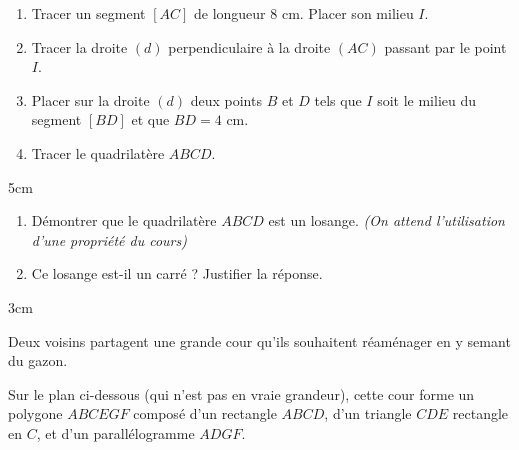 \documentclass[a4paper]{book}
\begin{document}
{\newpage


    \begin{exercice}
        \begin{enumerate}
            \item Tracer un segment $[AC]$ de longueur $8 \text{ cm}$. Placer son milieu $I$.
            \item Tracer la droite $(d)$ perpendiculaire à la droite $(AC)$ passant par le point $I$.
            \item Placer sur la droite $(d)$ deux points $B$ et $D$ tels que $I$ soit le milieu du segment $[BD]$ et que $BD = 4 \text{ cm}$.
            \item Tracer le quadrilatère $ABCD$.
        \end{enumerate}
        
        \begin{ZoneReponse}{5cm}
        \end{ZoneReponse}
        
        \begin{enumerate}[start=5]
            \item Démontrer que le quadrilatère $ABCD$ est un losange. \textit{(On attend l'utilisation d'une propriété du cours)}
            \item Ce losange est-il un carré ? Justifier la réponse.
        \end{enumerate}
        
        \begin{ZoneReponse}{3cm}
        \end{ZoneReponse}
    \end{exercice}
    
    
    \begin{exercice}
        \begin{minipage}{0.49\linewidth}
            Deux voisins partagent une grande cour qu'ils souhaitent réaménager en y semant du gazon.
            
            Sur le plan ci-dessous (qui n'est pas en vraie grandeur), cette cour forme un polygone $ABCEGF$ composé d'un rectangle $ABCD$, d'un triangle $CDE$ rectangle en $C$, et d'un parallélogramme $ADGF$.
        \end{minipage}
        \hfill
        \begin{minipage}{0.49\linewidth}
            \begin{center}
\end{center}
\end{minipage}
\end{exercice}}
\end{document}
